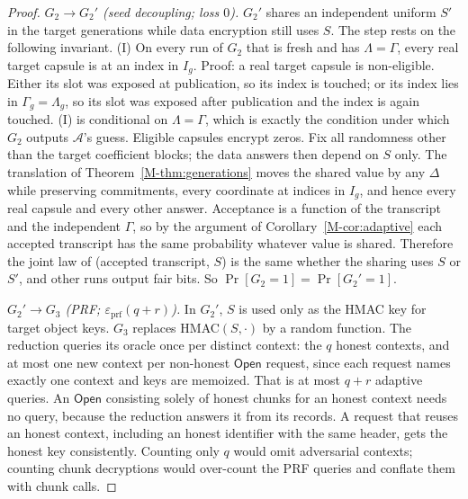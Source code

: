 \documentclass[pdflatex,sn-mathphys-num]{sn-jnl}
\theoremstyle{plain}
\begin{document}
\begin{proof}
\emph{$G_2\to G_2'$ (seed decoupling; loss $0$).} $G_2'$ shares an independent uniform $S'$ in the target generations while data encryption still uses $S$. The step rests on the following invariant. (I) On every run of $G_2$ that is fresh and has $\Lambda=\Gamma$, every real target capsule is at an index in $I_g$. Proof: a real target capsule is non-eligible. Either its slot was exposed at publication, so its index is touched; or its index lies in $\Gamma_g=\Lambda_g$, so its slot was exposed after publication and the index is again touched. (I) is conditional on $\Lambda=\Gamma$, which is exactly the condition under which $G_2$ outputs $\mathcal A$'s guess. Eligible capsules encrypt zeros. Fix all randomness other than the target coefficient blocks; the data answers then depend on $S$ only. The translation of Theorem~\ref{M-thm:generations} moves the shared value by any $\Delta$ while preserving commitments, every coordinate at indices in $I_g$, and hence every real capsule and every other answer. Acceptance is a function of the transcript and the independent $\Gamma$, so by the argument of Corollary~\ref{M-cor:adaptive} each accepted transcript has the same probability whatever value is shared. Therefore the joint law of (accepted transcript, $S$) is the same whether the sharing uses $S$ or $S'$, and other runs output fair bits. So $\Pr[G_2=1]=\Pr[G_2'=1]$.

\emph{$G_2'\to G_3$ (PRF; $\varepsilon_{\mathrm{prf}}(q+r)$).} In $G_2'$, $S$ is used only as the HMAC key for target object keys. $G_3$ replaces HMAC$(S,\cdot)$ by a random function. The reduction queries its oracle once per distinct context: the $q$ honest contexts, and at most one new context per non-honest $\mathsf{Open}$ request, since each request names exactly one context and keys are memoized. That is at most $q+r$ adaptive queries. An $\mathsf{Open}$ consisting solely of honest chunks for an honest context needs no query, because the reduction answers it from its records. A request that reuses an honest context, including an honest identifier with the same header, gets the honest key consistently. Counting only $q$ would omit adversarial contexts; counting chunk decryptions would over-count the PRF queries and conflate them with chunk calls.


\end{proof}
\end{document}
